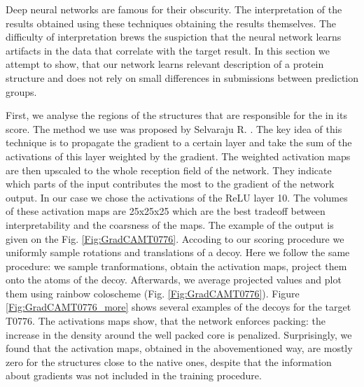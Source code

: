 Deep neural networks are famous for their obscurity. The interpretation of the results obtained using these techniques 
obtaining the results themselves. The difficulty of interpretation brews the suspiction that the neural network learns 
artifacts in the data that correlate with the target result. In this section we attempt to show, that our network 
learns relevant description of a protein structure and does not rely on small differences in submissions between prediction groups.

First, we analyse the regions of the structures that are responsible for the  in its score. The method we use was proposed 
by Selvaraju R. \cite{selvaraju2016grad}. The key idea of this technique is to propagate the gradient to a certain layer and take the sum of the 
activations of this layer weighted by the gradient. The weighted activation maps are then upscaled to the whole reception field of the network.
They indicate which parts of the input contributes the most to the gradient of the network output. In our case we chose the activations 
of the ReLU layer 10. The volumes of these activation maps are 25x25x25 which are the best tradeoff between interpretability and the coarsness 
of the maps. The example of the output is given on the Fig. \ref{Fig:GradCAMT0776}. Accoding to our scoring procedure we uniformly sample rotations 
and translations of a decoy. Here we follow the same procedure: we sample tranformations, obtain the activation maps, project them onto 
the atoms of the decoy. Afterwards, we average projected values and plot them using rainbow coloscheme (Fig. \ref{Fig:GradCAMT0776}). 
Figure \ref{Fig:GradCAMT0776_more} shows several examples of the decoys for the target T0776. 
The activations maps show, that the network enforces packing: the increase in the density 
around the well packed core is penalized. Surprisingly, we found that the activation maps, obtained in the abovementioned way, 
are mostly zero for the structures close to the native ones, despite that the information about gradients was not included in 
the training procedure. 

